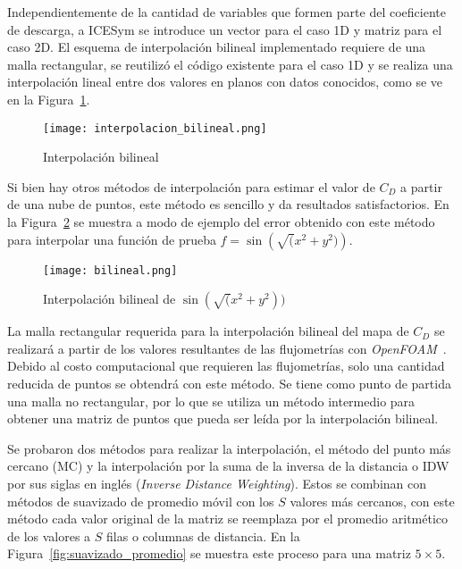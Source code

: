 

Independientemente de la cantidad de variables que formen parte del coeficiente
de descarga, a ICESym se introduce un vector para el caso 1D y matriz para el
caso 2D.
%
El esquema de interpolación bilineal implementado requiere de una malla
rectangular, se reutilizó el código existente para el caso 1D y se realiza una
interpolación lineal entre dos valores en planos con datos conocidos, como se ve
en la Figura~\ref{fig:interp_bilineal}.

\begin{figure}
    \centering
    \texttt{[image: interpolacion\_bilineal.png]}
    \caption{Interpolación bilineal\protect\footnotemark}\label{fig:interp_bilineal}
\end{figure}


Si bien hay otros métodos de interpolación para estimar el valor de $C_D$ a
partir de una nube de puntos, este método es sencillo y da resultados
satisfactorios.
%
En la Figura~\ref{fig:bilineal} se muestra a modo de ejemplo del error obtenido
con este método para interpolar una función de prueba
$f=\sin\left(\sqrt(x^2 + y^2)\right)$.

\begin{figure}
    \centering
    \texttt{[image: bilineal.png]}
    \caption{Interpolación bilineal de $\sin(\sqrt(x^2 + y^2))$}\label{fig:bilineal}
\end{figure}

La malla rectangular requerida para la interpolación bilineal del mapa de
$C_{D}$ se realizará a partir de los valores resultantes de las flujometrías con
\emph{OpenFOAM}~\parencite{openfoam}.
%
Debido al costo computacional que requieren las flujometrías, solo una cantidad
reducida de puntos se obtendrá con este método.
%
Se tiene como punto de partida una malla no rectangular, por lo que se utiliza
un método intermedio para obtener una matriz de puntos que pueda ser leída por
la interpolación bilineal.

Se probaron dos métodos para realizar la interpolación, el método del punto más
cercano (MC) y la interpolación por la suma de la inversa de la distancia o IDW por
sus siglas en inglés (\emph{Inverse Distance Weighting}).
%
Estos se combinan con métodos de suavizado de promedio móvil con los $S$ valores
más cercanos, con este método cada valor original de la matriz se reemplaza por
el promedio aritmético de los valores a $S$ filas o columnas de distancia.
%
En la Figura~\ref{fig:suavizado_promedio} se muestra este proceso para una
matriz $5\times5$.


